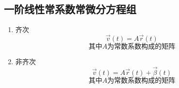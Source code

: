 \documentclass[UTF8]{ctexart}
\begin{document}
\subsection{一阶线性常系数常微分方程组}
\begin{enumerate}
    \item 齐次\[\vec v(t) = A \vec r(t)\]\[\text{其中}A\text{为常数系数构成的矩阵}\]
    \item 非齐次\[\vec v(t) = A \vec r(t)+\vec \beta (t)\]\[\text{其中}A\text{为常数系数构成的矩阵}\]

\end{enumerate}
\end{document}
